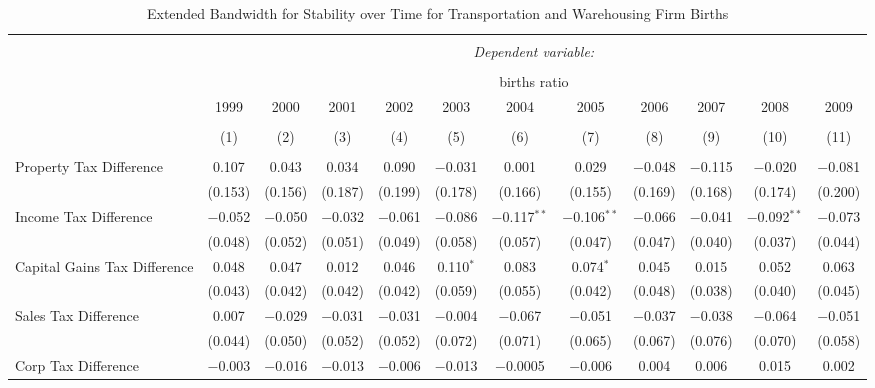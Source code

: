 
\begin{table}[!htbp] \centering 
  \caption{Extended Bandwidth for Stability over Time for  Transportation and Warehousing Firm Births} 
  \label{} 
\begin{tabular}{@{\extracolsep{5pt}}lccccccccccc} 
\\[-1.8ex]\hline 
\hline \\[-1.8ex] 
 & \multicolumn{11}{c}{\textit{Dependent variable:}} \\ 
\cline{2-12} 
\\[-1.8ex] & \multicolumn{11}{c}{births ratio} \\ 
 & 1999 & 2000 & 2001 & 2002 & 2003 & 2004 & 2005 & 2006 & 2007 & 2008 & 2009 \\ 
\\[-1.8ex] & (1) & (2) & (3) & (4) & (5) & (6) & (7) & (8) & (9) & (10) & (11)\\ 
\hline \\[-1.8ex] 
 Property Tax Difference & 0.107 & 0.043 & 0.034 & 0.090 & $-$0.031 & 0.001 & 0.029 & $-$0.048 & $-$0.115 & $-$0.020 & $-$0.081 \\ 
  & (0.153) & (0.156) & (0.187) & (0.199) & (0.178) & (0.166) & (0.155) & (0.169) & (0.168) & (0.174) & (0.200) \\ 
  Income Tax Difference & $-$0.052 & $-$0.050 & $-$0.032 & $-$0.061 & $-$0.086 & $-$0.117$^{**}$ & $-$0.106$^{**}$ & $-$0.066 & $-$0.041 & $-$0.092$^{**}$ & $-$0.073 \\ 
  & (0.048) & (0.052) & (0.051) & (0.049) & (0.058) & (0.057) & (0.047) & (0.047) & (0.040) & (0.037) & (0.044) \\ 
  Capital Gains Tax Difference & 0.048 & 0.047 & 0.012 & 0.046 & 0.110$^{*}$ & 0.083 & 0.074$^{*}$ & 0.045 & 0.015 & 0.052 & 0.063 \\ 
  & (0.043) & (0.042) & (0.042) & (0.042) & (0.059) & (0.055) & (0.042) & (0.048) & (0.038) & (0.040) & (0.045) \\ 
  Sales Tax Difference & 0.007 & $-$0.029 & $-$0.031 & $-$0.031 & $-$0.004 & $-$0.067 & $-$0.051 & $-$0.037 & $-$0.038 & $-$0.064 & $-$0.051 \\ 
  & (0.044) & (0.050) & (0.052) & (0.052) & (0.072) & (0.071) & (0.065) & (0.067) & (0.076) & (0.070) & (0.058) \\ 
  Corp Tax Difference & $-$0.003 & $-$0.016 & $-$0.013 & $-$0.006 & $-$0.013 & $-$0.0005 & $-$0.006 & 0.004 & 0.006 & 0.015 & 0.002 \\ 

\end{tabular}
\end{table}
